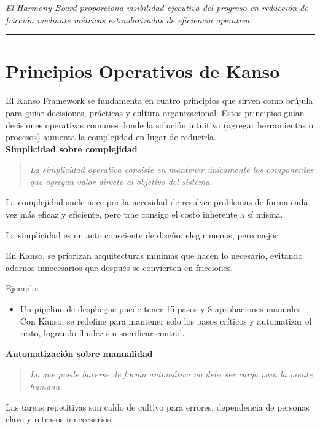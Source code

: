 {\epigraph{\textit{El Harmony Board proporciona visibilidad ejecutiva del progreso en reducción de fricción mediante métricas estandarizadas de eficiencia operativa.}}{}}


\hrule
\section{Principios Operativos de Kanso}

El Kanso Framework se fundamenta en cuatro principios que sirven como brújula para guiar decisiones, prácticas y cultura organizacional. Estos principios guían decisiones operativas comunes donde la solución intuitiva (agregar herramientas o procesos) aumenta la complejidad en lugar de reducirla.\\

\textbf{Simplicidad sobre complejidad}
\begin{quote}
\textit{La simplicidad operativa consiste en mantener únicamente los componentes que agregan valor directo al objetivo del sistema.}
\end{quote}

La complejidad suele nace por la necesidad de resolver problemas de forma cada vez más eficaz y eficiente, pero trae consigo el costo inherente a sí misma.

La simplicidad es un acto consciente de diseño: elegir menos, pero mejor.

En Kanso, se priorizan arquitecturas mínimas que hacen lo necesario, evitando adornos innecesarios que después se convierten en fricciones.

Ejemplo:
\begin{itemize}
    \item Un pipeline de despliegue puede tener 15 pasos y 8 aprobaciones manuales. Con Kanso, se redefine para mantener solo los pasos críticos y automatizar el resto, logrando fluidez sin sacrificar control.
\end{itemize}

\textbf{Automatización sobre manualidad}
\begin{quote}
\textit{Lo que puede hacerse de forma automática no debe ser carga para la mente humana.}
\end{quote}

Las tareas repetitivas son caldo de cultivo para errores, dependencia de personas clave y retrasos innecesarios.


